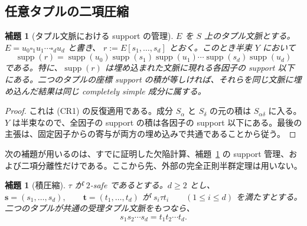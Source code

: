 \documentclass[10pt,a4paper]{ltjsarticle}
\newtheorem{lemma}[theorem]{補題}
\theoremstyle{definition}
\theoremstyle{remark}
\newcommand{\blank}{\square}
\begin{document}
\subsection{任意タプルの二項圧縮}

\begin{lemma}[タプル文脈における support の管理]
\label{cr:lem:support-bookkeeping}
$E$ を $S$ 上のタプル文脈とする。
\(E=u_0\blank_1u_1\cdots\blank_du_d\) と書き、
\(r:=E[s_1,\ldots,s_d]\)
とおく。このとき半束 $Y$ において
\[
\operatorname{supp}(r)
=\operatorname{supp}(u_0)\operatorname{supp}(s_1)\operatorname{supp}(u_1)\cdots
\operatorname{supp}(s_d)\operatorname{supp}(u_d)
\]
である。特に、\(\operatorname{supp}(r)\) は埋め込まれた文脈に現れる各因子の support 以下にある。二つのタプルの座標 support の積が等しければ、それらを同じ文脈に埋め込んだ結果は同じ completely simple 成分に属する。
\end{lemma}

\begin{proof}
これは \textup{(CR1)} の反復適用である。成分 $S_\alpha$ と $S_\delta$ の元の積は $S_{\alpha\delta}$ に入る。$Y$ は半束なので、全因子の support の積は各因子の support 以下にある。最後の主張は、固定因子からの寄与が両方の埋め込みで共通であることから従う。
\end{proof}

次の補題が用いるのは、すでに証明した欠陥計算、補題~\ref{cr:lem:support-bookkeeping} の support 管理、および二項分離性だけである。ここから先、外部の完全正則半群定理は用いない。

\begin{lemma}[積圧縮]
\label{cr:lem:product-compression}
$\tau$ が $2$-safe であるとする。$d\ge2$ とし、
\(\mathbf s=(s_1,\ldots,s_d), \qquad \mathbf t=(t_1,\ldots,t_d)\)
が
\(s_i\tau t_i \qquad(1\le i\le d)\)
を満たすとする。二つのタプルが共通の受理タプル文脈をもつなら、
\begin{equation}
s_1s_2\cdots s_d
=
t_1t_2\cdots t_d.
\label{eq:cr-product-compression}
\end{equation}
\end{lemma}
\end{document}
